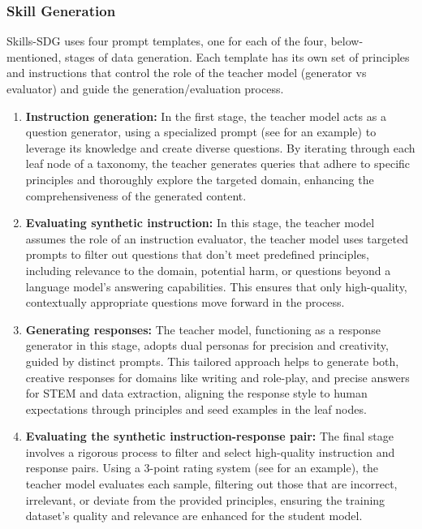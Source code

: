 \subsubsection{Skill Generation}
Skills-SDG uses four prompt templates, one for each of the four, below-mentioned, stages of data generation. Each template has its own set of principles and instructions that control the role of the teacher model (generator vs evaluator) and guide the generation/evaluation process.

\begin{enumerate}
    \item \textbf{Instruction generation:} In the first stage, the teacher model acts as a question generator, using a specialized prompt (see  for an example) to leverage its knowledge and create diverse questions. By iterating through each leaf node of a taxonomy, the teacher generates queries that adhere to specific principles and thoroughly explore the targeted domain, enhancing the comprehensiveness of the generated content. 
    \item \textbf{Evaluating synthetic instruction:} In this stage, the teacher model assumes the role of an instruction evaluator, the teacher model uses targeted prompts to filter out questions that don't meet predefined principles, including relevance to the domain, potential harm, or questions beyond a language model's answering capabilities. This ensures that only high-quality, contextually appropriate questions move forward in the process.
    \item \textbf{Generating responses:} The teacher model, functioning as a response generator in this stage, adopts dual personas for precision and creativity, guided by distinct prompts. This tailored approach helps to generate both, creative responses for domains like writing and role-play, and precise answers for STEM and data extraction, aligning the response style to human expectations through principles and seed examples in the leaf nodes.
    \item \textbf{Evaluating the synthetic instruction-response pair:} The final stage involves a rigorous process to filter and select high-quality instruction and response pairs. Using a 3-point rating system (see  for an example), the teacher model evaluates each sample, filtering out those that are incorrect, irrelevant, or deviate from the provided principles, ensuring the training dataset's quality and relevance are enhanced for the student model.

\end{enumerate}

